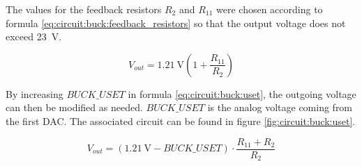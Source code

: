 \begin{figure}[th!]
\end{figure}


\begin{minipage}{.4\textwidth}
    The  values for  the feedback  resistors  $R_2$ and  $R_{11}$ were  chosen
    according to formula  \ref{eq:circuit:buck:feedback_resistors} so that the
    output voltage does not exceed \SI{23}{\volt}.
\end{minipage}
\begin{minipage}{.6\textwidth}
    \begin{equation}
        V_{out} = \SI{1.21}{\volt} \left( 1 + \frac{R_{11}}{R_2} \right)
        \label{eq:circuit:buck:feedback_resistors}
    \end{equation}
\end{minipage}

\begin{minipage}{.40\textwidth}
    By  increasing  $BUCK\_USET$  in formula  \ref{eq:circuit:buck:uset},  the
    outgoing  voltage can  then be  modified as  needed.  $BUCK\_USET$  is the
    analog voltage  coming from the  first DAC. The associated circuit  can be
    found in figure \ref{fig:circuit:buck:uset}.
\end{minipage}
\begin{minipage}{.60\textwidth}
    \begin{equation}
        V_{out} = (\SI{1.21}{\volt} - BUCK\_USET) \cdot \frac{R_{11} + R_2}{R_2}
        \label{eq:circuit:buck:uset}
    \end{equation}
\end{minipage}


